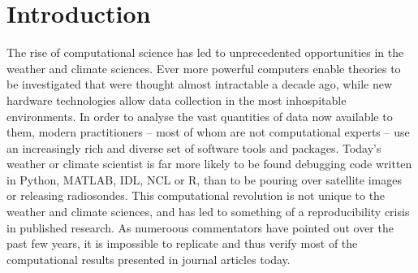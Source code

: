 \section{Introduction}
The rise of computational science has led to unprecedented opportunities in the weather and climate sciences. Ever more powerful computers enable theories to be investigated that were thought almost intractable a decade ago, while new hardware technologies allow data collection in the most inhospitable environments. In order to analyse the vast quantities of data now available to them, modern practitioners – most of whom are not computational experts – use an increasingly rich and diverse set of software tools and packages. Today's weather or climate scientist is far more likely to be found debugging code written in Python, MATLAB, IDL, NCL or R, than to be pouring over satellite images or releasing radiosondes. 
This computational revolution is not unique to the weather and climate sciences, and has led to something of a reproducibility crisis in published research. As numeroous commentators have pointed out over the past few years, it is impossible to replicate and thus verify most of the computational results presented in journal articles today.

